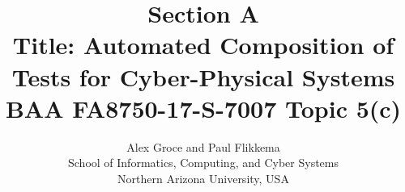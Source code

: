 \documentclass[12pt]{article}
\newcommand{\mycomment}[1]{}
\begin{document}

\title{Section A\\Title: Automated Composition of Tests for
  Cyber-Physical Systems\\
\small{BAA FA8750-17-S-7007 Topic 5(c)}}

\author{Alex Groce and Paul Flikkema\\
School of Informatics, Computing, and Cyber Systems \\
  Northern Arizona University, USA}




%

\mycomment{

\author{\IEEEauthorblockN{%
Alex Groce,\IEEEauthorrefmark{1}
Josie Holmes\IEEEauthorrefmark{2}
Kevin Kellar\IEEEauthorrefmark{3}
}

\IEEEauthorblockA{\IEEEauthorrefmark{1}%
School of Electrical Engineering and Computer Science\\
Oregon State University\\
\IEEEauthorrefmark{2}
Department of Geography\\
Pennsylvania State University
\IEEEauthorrefmark{3}
Crescent Valley High School
}


}
}
\end{document}
